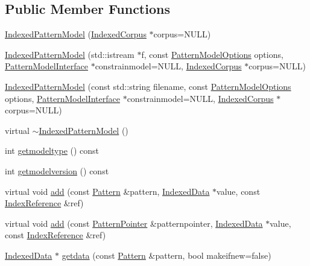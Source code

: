 \subsection*{Public Member Functions}
\begin{DoxyCompactItemize}
\item 
\hyperlink{classIndexedPatternModel_ae2334d12047a541e3ffba097a88510cd}{Indexed\+Pattern\+Model} (\hyperlink{classIndexedCorpus}{Indexed\+Corpus} $\ast$corpus=N\+U\+L\+L)
\item 
\hyperlink{classIndexedPatternModel_a4c22b5b077ece88e477f6916cd40cd67}{Indexed\+Pattern\+Model} (std\+::istream $\ast$f, const \hyperlink{classPatternModelOptions}{Pattern\+Model\+Options} options, \hyperlink{classPatternModelInterface}{Pattern\+Model\+Interface} $\ast$constrainmodel=N\+U\+L\+L, \hyperlink{classIndexedCorpus}{Indexed\+Corpus} $\ast$corpus=N\+U\+L\+L)
\item 
\hyperlink{classIndexedPatternModel_a30b96b36aac65dbd009bf42c959e55a7}{Indexed\+Pattern\+Model} (const std\+::string filename, const \hyperlink{classPatternModelOptions}{Pattern\+Model\+Options} options, \hyperlink{classPatternModelInterface}{Pattern\+Model\+Interface} $\ast$constrainmodel=N\+U\+L\+L, \hyperlink{classIndexedCorpus}{Indexed\+Corpus} $\ast$corpus=N\+U\+L\+L)
\item 
virtual \hyperlink{classIndexedPatternModel_ae3de4425dbc90cd9db0cce63e744a64d}{$\sim$\+Indexed\+Pattern\+Model} ()
\item 
int \hyperlink{classIndexedPatternModel_a63f42808d22dd3a813242332ad42ee6c}{getmodeltype} () const 
\item 
int \hyperlink{classIndexedPatternModel_a50e185e2f7e48751f8633d4b981089bc}{getmodelversion} () const 
\item 
virtual void \hyperlink{classIndexedPatternModel_a9ae48ed363f333a57cbec0538a434497}{add} (const \hyperlink{classPattern}{Pattern} \&pattern, \hyperlink{classIndexedData}{Indexed\+Data} $\ast$value, const \hyperlink{classIndexReference}{Index\+Reference} \&ref)
\item 
virtual void \hyperlink{classIndexedPatternModel_a27d944449ea3e5f6d1c578770b07ad13}{add} (const \hyperlink{classPatternPointer}{Pattern\+Pointer} \&patternpointer, \hyperlink{classIndexedData}{Indexed\+Data} $\ast$value, const \hyperlink{classIndexReference}{Index\+Reference} \&ref)
\item 
\hyperlink{classIndexedData}{Indexed\+Data} $\ast$ \hyperlink{classIndexedPatternModel_af242c0b747c2467e9e89f1cd731fe2d1}{getdata} (const \hyperlink{classPattern}{Pattern} \&pattern, bool makeifnew=false)

\end{DoxyCompactItemize}
